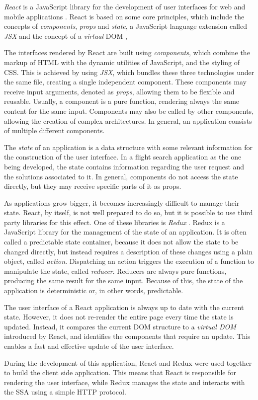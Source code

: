 \textit{React} is a JavaScript library for the development of user interfaces for web and mobile applications \cite{react}. React is based on some core principles, which include the concepts of \textit{components}, \textit{props} and \textit{state}, a JavaScript language extension called \textit{JSX} and the concept of a  \textit{virtual} \ac{DOM} \cite{react_redux_article},

The interfaces rendered by React are built using \textit{components}, which combine the markup of HTML with the dynamic utilities of JavaScript, and the styling of CSS. This is achieved by using \textit{JSX}, which bundles these three technologies under the same file, creating a single independent component. These components may receive input arguments, denoted as \textit{props}, allowing them to be flexible and reusable. Usually, a component is a pure function, rendering always the same content for the same input. Components may also be called by other components, allowing the creation of complex architectures. In general, an application consists of multiple different components.  

The \textit{state} of an application is a data structure with some relevant information for the construction of the user interface. In a flight search application as the one being developed, the state contains information regarding the user request and the solutions associated to it. In general, components do not access the state directly, but they may receive specific parts of it as props.   

As applications grow bigger, it becomes increasingly difficult to manage their state. React, by itself, is not well prepared to do so, but it is possible to use third party libraries for this effect. One of these libraries is \textit{Redux} \cite{redux}. Redux is a JavaScript library for the management of the state of an application. It is often called a predictable state container, because it does not allow the state to be changed directly, but instead requires a description of these changes using a plain object, called \textit{action}. Dispatching an action triggers the execution of a function to manipulate the state, called \textit{reducer}. Reducers are always pure functions, producing the same result for the same input. Because of this, the state of the application is deterministic or, in other words, predictable.

The user interface of a React application is always up to date with the current state. However, it does not re-render the entire page every time the state is updated. Instead, it compares the current DOM structure to a \textit{virtual DOM} introduced by React, and identifies the components that require an update. This enables a fast and effective update of the user interface.

During the development of this application, React and Redux were used together to build the client side application. This means that React is responsible for rendering the user interface, while Redux manages the state and interacts with the SSA using a simple HTTP protocol.

